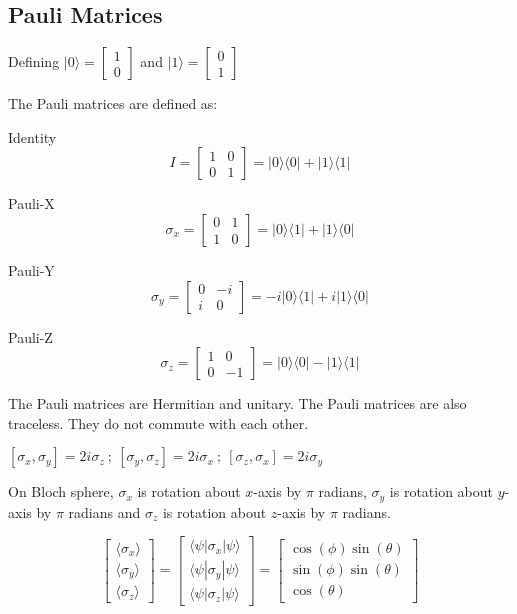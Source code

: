 \documentclass[
  letterpaper,
  DIV=11,
  numbers=noendperiod]{scrreprt}
\begin{document}
\subsection*{Pauli Matrices}\label{pauli-matrices}

Defining \(|0\rangle = \begin{bmatrix} 1 \\ 0 \end{bmatrix}\) and
\(|1\rangle = \begin{bmatrix} 0 \\ 1 \end{bmatrix}\)

The Pauli matrices are defined as:

Identity
\[ I = \begin{bmatrix} 1 & 0 \\ 0 & 1 \end{bmatrix} = |0\rangle \langle 0 | + |1\rangle \langle 1 | \]

Pauli-X
\[ \sigma_x = \begin{bmatrix} 0 & 1 \\ 1 & 0 \end{bmatrix} = |0\rangle \langle 1 | + |1\rangle \langle 0 | \]

Pauli-Y
\[ \sigma_y = \begin{bmatrix} 0 & -i \\ i & 0 \end{bmatrix} = -i|0\rangle \langle 1 | + i|1\rangle \langle 0 | \]

Pauli-Z
\[ \sigma_z = \begin{bmatrix} 1 & 0 \\ 0 & -1 \end{bmatrix} = |0\rangle \langle 0 | - |1\rangle \langle 1 | \]

The Pauli matrices are Hermitian and unitary. The Pauli matrices are
also traceless. They do not commute with each other.

\([\sigma_x, \sigma_y] = 2i\sigma_z\ ;\ [\sigma_y, \sigma_z] = 2i\sigma_x\ ;\ [\sigma_z, \sigma_x] = 2i\sigma_y\)

On Bloch sphere, \(\sigma_x\) is rotation about \(x\)-axis by \(\pi\)
radians, \(\sigma_y\) is rotation about \(y\)-axis by \(\pi\) radians
and \(\sigma_z\) is rotation about \(z\)-axis by \(\pi\) radians.

\[ \begin{bmatrix} \langle \sigma_x \rangle \\ \langle \sigma_y \rangle \\ \langle \sigma_z \rangle \end{bmatrix} = \begin{bmatrix} \langle \psi | \sigma_x | \psi \rangle \\ \langle \psi | \sigma_y | \psi \rangle \\ \langle \psi | \sigma_z | \psi \rangle \end{bmatrix} = \begin{bmatrix} \cos(\phi)\sin(\theta) \\ \sin(\phi)\sin(\theta) \\ \cos(\theta) \end{bmatrix} \]
\end{document}
